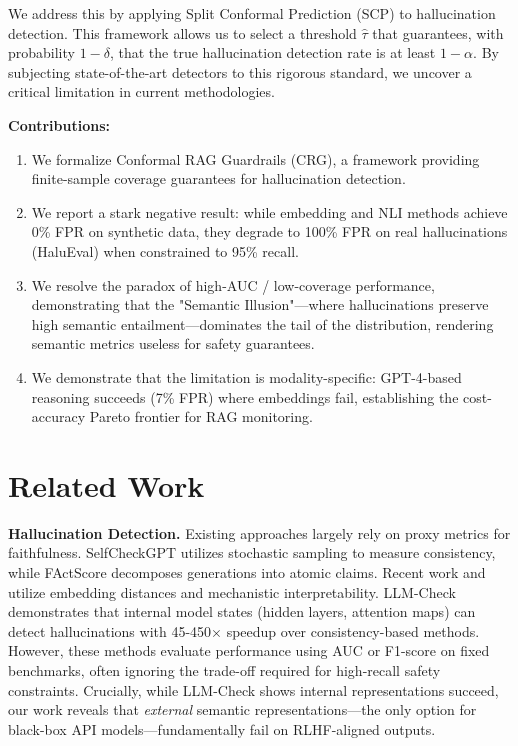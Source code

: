 \documentclass[11pt]{article}
\newcommand{\modelname}{CRG}
\begin{document}
We address this by applying Split Conformal Prediction (SCP) \cite{vovk2005algorithmic} to hallucination detection. This framework allows us to select a threshold $\hat{\tau}$ that guarantees, with probability $1-\delta$, that the true hallucination detection rate is at least $1-\alpha$. By subjecting state-of-the-art detectors to this rigorous standard, we uncover a critical limitation in current methodologies.

\textbf{Contributions:}
\begin{enumerate}
    \item We formalize Conformal RAG Guardrails (\modelname{}), a framework providing finite-sample coverage guarantees for hallucination detection.
    \item We report a stark negative result: while embedding and NLI methods achieve 0\% FPR on synthetic data, they degrade to 100\% FPR on real hallucinations (HaluEval) when constrained to 95\% recall.
    \item We resolve the paradox of high-AUC / low-coverage performance, demonstrating that the "Semantic Illusion"---where hallucinations preserve high semantic entailment---dominates the tail of the distribution, rendering semantic metrics useless for safety guarantees.
    \item We demonstrate that the limitation is modality-specific: GPT-4-based reasoning succeeds (7\% FPR) where embeddings fail, establishing the cost-accuracy Pareto frontier for RAG monitoring.
\end{enumerate}

\section{Related Work}

\textbf{Hallucination Detection.} Existing approaches largely rely on proxy metrics for faithfulness. SelfCheckGPT \cite{manakul2023selfcheckgpt} utilizes stochastic sampling to measure consistency, while FActScore \cite{min2023factscore} decomposes generations into atomic claims. Recent work \cite{xiang2025redeep} and \cite{zhang2025embeddingdistance} utilize embedding distances and mechanistic interpretability. LLM-Check \cite{sriramanan2024llmcheck} demonstrates that internal model states (hidden layers, attention maps) can detect hallucinations with 45-450$\times$ speedup over consistency-based methods. However, these methods evaluate performance using AUC or F1-score on fixed benchmarks, often ignoring the trade-off required for high-recall safety constraints. Crucially, while LLM-Check shows internal representations succeed, our work reveals that \textit{external} semantic representations---the only option for black-box API models---fundamentally fail on RLHF-aligned outputs.
\end{document}
